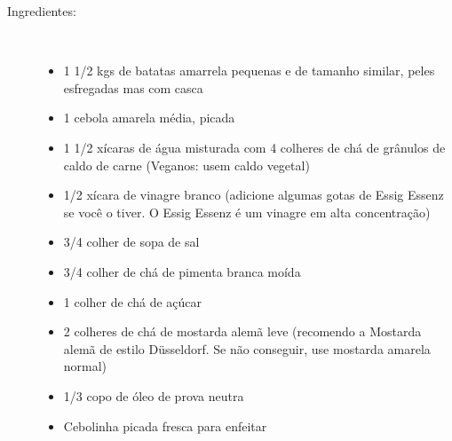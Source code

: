 \documentclass [11pt, letterpaper] {article}
\begin{document}
\begin {description}

\item [Ingredientes:] \ \\
\begin {itemize}
\item 1 1/2 kgs de batatas amarrela pequenas e de tamanho similar,
peles esfregadas mas com casca
\item 1 cebola amarela média, picada
\item 1 1/2 xícaras de água misturada com 4 colheres de chá de grânulos de caldo de carne (Veganos: usem caldo vegetal)
\item 1/2 xícara de vinagre branco (adicione algumas gotas de Essig
Essenz se você o tiver. O Essig Essenz \'e um vinagre em alta concentra\c{c}\~ao)
\item 3/4 colher de sopa de sal
\item 3/4 colher de chá de pimenta branca moída
\item 1 colher de chá de açúcar
\item 2 colheres de chá de mostarda alemã leve (recomendo a Mostarda alemã de estilo Düsseldorf. Se não conseguir, use mostarda amarela normal)
\item 1/3 copo de óleo de prova neutra
\item Cebolinha picada fresca para enfeitar
\end {itemize}



\end{description}
\end{document}

